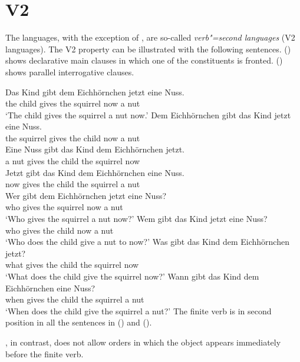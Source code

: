 \section{V2}
\label{sec-phenomenon-v2}

The  languages, with the exception of , are so-called \emph{verb"=second languages} (V2
languages). The V2
property can be illustrated with the following  sentences. () shows declarative main
clauses in which one of the constituents is fronted. () shows parallel interrogative clauses.

\eal
\ex 
\gll Das Kind  gibt dem Eichhörnchen jetzt eine Nuss.\\
     the child gives the squirrel now a nut\\
\glt `The child gives the squirrel a nut now.'
\ex 
\gll Dem Eichhörnchen gibt das Kind jetzt eine Nuss.\\
     the squirrel gives the child now a nut\\
\ex 
\gll Eine Nuss gibt das Kind dem Eichhörnchen jetzt.\\
     a nut gives the child the squirrel now\\
\ex 
\gll Jetzt gibt das Kind dem Eichhörnchen eine Nuss.\\
     now gives the child the squirrel a nut\\
\zl
\eal
\ex 
\gll Wer gibt dem Eichhörnchen jetzt eine Nuss?\\  
     who gives the squirrel now a nut\\
\glt `Who gives the squirrel a nut now?'
\ex 
\gll Wem gibt das Kind jetzt eine Nuss?\\
     who gives the child now a nut\\
\glt `Who does the child give a nut to now?'
\ex 
\gll Was gibt das Kind dem Eichhörnchen jetzt?\\
     what gives the child the squirrel now\\
\glt `What does the child give the squirrel now?'
\ex 
\gll Wann gibt das Kind dem Eichhörnchen eine Nuss?\\
     when gives the child the squirrel a nut\\
\glt `When does the child give the squirrel a nut?'
\zl
The finite verb is in second position in all the sentences in () and ().


, in contrast, does not allow orders in which the object appears immediately before the
finite verb.

